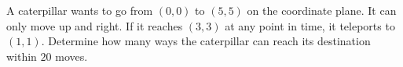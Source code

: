 A caterpillar wants to go from $(0, 0)$ to $(5, 5)$ on the coordinate plane. It can only move up and right. If it reaches $(3, 3)$ at any point in time, it teleports to $(1, 1)$. Determine how many ways the caterpillar can reach its destination within $20$ moves.
